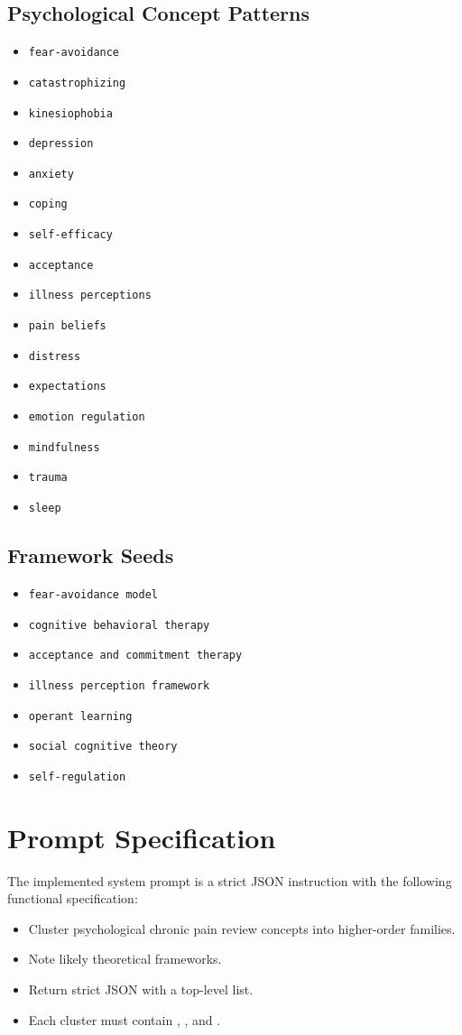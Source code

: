 \documentclass[11pt]{article}
\begin{document}
\subsection*{Psychological Concept Patterns}
\begin{itemize}
\item \texttt{fear-avoidance}
\item \texttt{catastrophizing}
\item \texttt{kinesiophobia}
\item \texttt{depression}
\item \texttt{anxiety}
\item \texttt{coping}
\item \texttt{self-efficacy}
\item \texttt{acceptance}
\item \texttt{illness perceptions}
\item \texttt{pain beliefs}
\item \texttt{distress}
\item \texttt{expectations}
\item \texttt{emotion regulation}
\item \texttt{mindfulness}
\item \texttt{trauma}
\item \texttt{sleep}
\end{itemize}

\subsection*{Framework Seeds}
\begin{itemize}
\item \texttt{fear-avoidance model}
\item \texttt{cognitive behavioral therapy}
\item \texttt{acceptance and commitment therapy}
\item \texttt{illness perception framework}
\item \texttt{operant learning}
\item \texttt{social cognitive theory}
\item \texttt{self-regulation}
\end{itemize}

\section*{Prompt Specification}
The implemented system prompt is a strict JSON instruction with the following functional specification:
\begin{itemize}
\item Cluster psychological chronic pain review concepts into higher-order families.
\item Note likely theoretical frameworks.
\item Return strict JSON with a top-level  list.
\item Each cluster must contain , , and .
\end{itemize}
\end{document}

